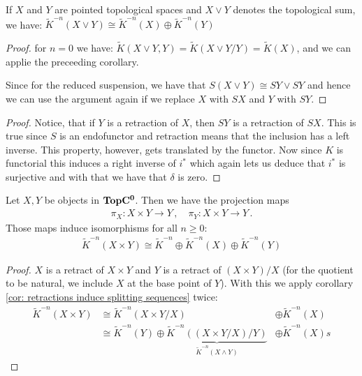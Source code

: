 \begin{theorem}[Additivity]
	If $X$ and $Y$ are pointed topological spaces and $X\vee Y$ denotes the topological sum, we have:
	$\tilde{K}^{-n}(X\vee Y)\cong \tilde{K}^{-n}(X)\oplus \tilde{K}^{-n}(Y)$
\end{theorem}
\begin{proof}
	for $n=0$ we have: 
	$\tilde{K}(X\vee Y,Y)=\tilde{K}(X\vee Y\slash Y)=\tilde{K}(X)$, and we can applie the preceeding corollary.
	
	Since for the reduced suspension, we have that $S(X\vee Y)\cong SY\vee SY$ and hence we can use the argument again if we replace $X$ with $SX$ and $Y$ with $SY$.
\end{proof}
\begin{proof}
	Notice, that if $Y$ is a retraction of $X$, then $SY$ is a retraction of $SX$. This is true since $S$ is an endofunctor and retraction means that the inclusion has a left inverse. This property, however, gets translated by the functor. Now since $K$ is functorial this induces a right inverse of $i^*$ which again lets us deduce that $i^*$ is surjective and with that we have that $\delta$ is zero.   
\end{proof}
\begin{corollary}
	Let $X,Y$ be objects in $\operatorname{\mathbf{TopC^0}}$. Then we have the projection maps 
	\begin{align*}
		\pi_X:X\times Y\to Y \, , \quad \pi_Y:X\times Y\to Y\, .
	\end{align*} Those maps induce isomorphisms for all $n\geq0:$
	\begin{align*}
		\tilde{K}^{-n}(X\times Y)\cong \tilde{K}^{-n}\oplus \tilde{K}^{-n}(X)\oplus \tilde{K}^{-n}(Y)
	\end{align*}
\end{corollary}
\begin{proof}
	$X$ is a retract of $X\times Y$ and $Y$ is a retract of $(X\times Y)\slash X$ (for the quotient to be natural, we include $X$ at the base point of $Y$). With this we apply corollary \ref{cor: retractions induce splitting sequences} twice:
	\begin{equation*}
		\begin{array}{lll}
			\tilde{K}^{-n}(X\times Y)&\cong \tilde{K}^{-n}(X\times Y \slash X) & \oplus \tilde{K}^{-n}(X) \\
			&\cong \tilde{K}^{-n}(Y) \oplus \underbrace{\tilde{K}^{-n}((X\times Y \slash X )\slash Y)}_{\tilde{K}^{-n}(X\wedge Y)}&\oplus\tilde{K}^{-n}(X)  
			s    \end{array}
	\end{equation*}
\end{proof}

